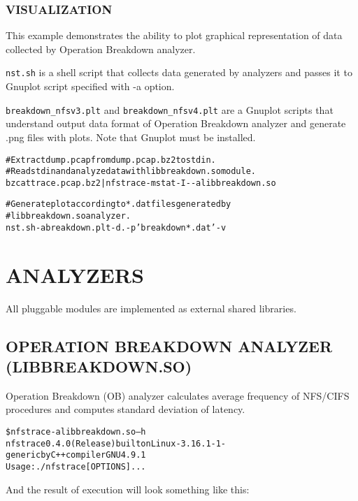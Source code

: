 \documentclass[oneside]{article}
\newcommand{\code}[1]{\texttt{#1}}
\newcommand{\includetext}[1]{
\begin{alltt}
    % \texttt{\fbox{\parbox{\textwidth}{\small{}}}}
    \small{}
\end{alltt}
}
\newcommand{\gls}{}
\begin{document}
\subsubsection{VISUALIZATION}
\label{sec:visualization}

This example demonstrates the ability to plot graphical representation of data
collected by Operation Breakdown analyzer.

\code{nst.sh} is a shell script that collects data generated by analyzers and
passes it to \gls{Gnuplot} script specified with -a option.  

\code{breakdown\_nfsv3.plt} and \code{breakdown\_nfsv4.plt} are a \gls{Gnuplot}
scripts that understand output data format of Operation Breakdown analyzer and
generate .png files with plots.  Note that \gls{Gnuplot} must be installed.

\begin{minipage}[t]{\linewidth}
\begin{alltt}
\# Extract dump.pcap from dump.pcap.bz2 to stdin.
\# Read stdin and analyze data with libbreakdown.so module. 
bzcat trace.pcap.bz2 | nfstrace -m stat -I - -a libbreakdown.so

\# Generate plot according to *.dat files generated by
\# libbreakdown.so analyzer. 
nst.sh -a breakdown.plt -d . -p 'breakdown*.dat' -v
\end{alltt} 
\end{minipage}

\section{ANALYZERS}

All pluggable modules are implemented as external shared libraries.

\subsection{OPERATION BREAKDOWN ANALYZER (LIBBREAKDOWN.SO)}

Operation Breakdown (OB) analyzer calculates average frequency of NFS/CIFS
procedures and computes standard deviation of latency.

\begin{alltt} 
\$ nfstrace -a libbreakdown.so –h
nfstrace 0.4.0 (Release) built on Linux-3.16.1-1-generic by C++ compiler GNU 4.9.1 
Usage: ./nfstrace [OPTIONS]... 
\end{alltt}
And the result of execution will look something like this:
\includetext{nfstrace_manual_includes/breakdown_output.txt}
\end{document}
